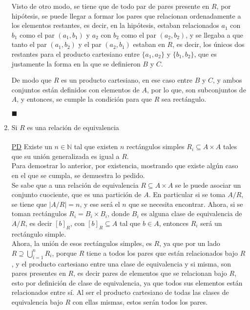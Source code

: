\documentclass[letter]{article}
\begin{document}
\begin{pregunta}{1}
\begin{enumerate}
		Visto de otro modo, se tiene que de todo par de pares presente en $R$, por hipótesis, se puede llegar a formar los pares que relacionan ordenadamente a los elementos restantes, es decir, en la hipótesis, estaban relacionados $a_1$ con $b_1$ como el par $(a_1, b_1)$ y $a_2$ con $b_2$ como el par $(a_2, b_2)$, y se llegaba a que tanto el par $(a_1, b_2)$ y el par $(a_2, b_1)$ estaban en $R$, es decir, los únicos dos restantes para el producto cartesiano entre $\{a_1, a_2\}$ y $\{b_1, b_2\}$, que es justamente la forma en la que se definieron $B$ y $C$.
		
		De modo que $R$ es un producto cartesiano, en ese caso entre $B$ y $C$, y ambos conjuntos están definidos con elementos de $A$, por lo que, son subconjuntos de $A$, y entonces, se cumple la condición para que $R$ sea rectángulo.
		\begin{flushright}$\blacksquare$\end{flushright}		 
		\item Si $R$ es una relación de equivalencia\\\\
		\underline{PD} Existe un $n \in \mathbb{N}$ tal que existen $n$ rectángulos simples $R_i \subseteq A \times A$ tales que su unión generalizada es igual a $R$.  \\
		
		Para demostrar lo anterior, por existencia, mostrando que existe algún caso en el que se cumpla, se demuestra lo pedido.\\
		
		Se sabe que a una relación de equivalencia $R\subseteq A\times A$ se le puede asociar un conjunto cuociente, que es una partición de $A$. En particular si se toma $A/R$, se tiene que $|A/R|=n$, y ese será el $n$ que se necesita encontrar. Ahora, si se toman rectángulos $R_i=B_i\times B_i$, donde $B_i$ es alguna clase de equivalencia de $A/R$, es decir $[b]_R$, con $[b]_R \subseteq A$ tal que $b \in A$, entonces $R_i$ será un rectángulo simple.\\
		
		Ahora, la unión de esos rectángulos simples, es $R$, ya que por un lado $R\supseteq \bigcup_{i=1}^{n}R_i$, porque $R$ tiene a todos los pares que están relacionados bajo $R$, y el producto cartesiano entre una clase de equivalencia y si misma, son pares presentes en $R$, es decir pares de elementos que se relacionan bajo $R$, esto por definición de clase de equivalencia, ya que todos sus elementos están relacionados entre sí. Al ser el producto cartesiano de todas las clases de equivalencia bajo $R$ con ellas mismas, estos serán todos los pares.\\
		

\end{enumerate}
\end{pregunta}
\end{document}
